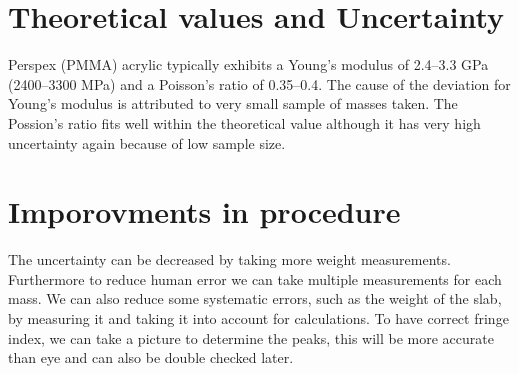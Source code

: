 \documentclass[%
sor,
jor,
 amsmath,amssymb,
 reprint,
longbibliography,
]{revtex4-2}
\begin{document}




\appendix
\section{Theoretical values and Uncertainty}
Perspex (PMMA) acrylic typically exhibits a Young's modulus of 2.4–3.3 GPa (2400–3300 MPa) and a Poisson's ratio of 0.35–0.4. The cause of the deviation for Young's modulus is attributed to very small sample of masses taken. The Possion's ratio fits well within the theoretical value although it has very high uncertainty again because of low sample size.

\section{Imporovments in procedure}
The uncertainty can be decreased by taking more weight measurements. Furthermore to reduce human error we can take multiple measurements for each mass. We can also reduce some systematic errors, such as the weight of the slab, by measuring it and taking it into account for calculations. To have correct fringe index, we can take a picture to determine the peaks, this will be more accurate than eye and can also be double checked later.
\end{document}
